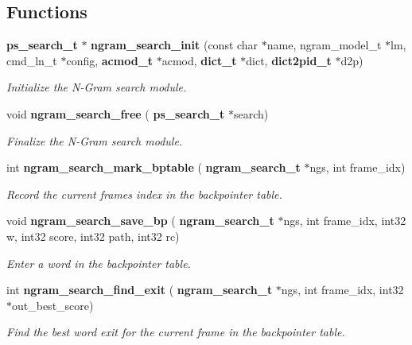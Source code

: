 \subsection*{Functions}
\begin{DoxyCompactItemize}
\item 
\mbox{\label{ngram__search_8c_a04f80b377c847026254fb85596e2f43c}} 
\textbf{ ps\+\_\+search\+\_\+t} $\ast$ \textbf{ ngram\+\_\+search\+\_\+init} (const char $\ast$name, ngram\+\_\+model\+\_\+t $\ast$lm, cmd\+\_\+ln\+\_\+t $\ast$config, \textbf{ acmod\+\_\+t} $\ast$acmod, \textbf{ dict\+\_\+t} $\ast$dict, \textbf{ dict2pid\+\_\+t} $\ast$d2p)
\begin{DoxyCompactList}\small\item\em Initialize the N-\/\+Gram search module. \end{DoxyCompactList}\item 
\mbox{\label{ngram__search_8c_aeaf140dc2bbeaa5c274f73480b5328f3}} 
void \textbf{ ngram\+\_\+search\+\_\+free} (\textbf{ ps\+\_\+search\+\_\+t} $\ast$search)
\begin{DoxyCompactList}\small\item\em Finalize the N-\/\+Gram search module. \end{DoxyCompactList}\item 
int \textbf{ ngram\+\_\+search\+\_\+mark\+\_\+bptable} (\textbf{ ngram\+\_\+search\+\_\+t} $\ast$ngs, int frame\+\_\+idx)
\begin{DoxyCompactList}\small\item\em Record the current frame\textquotesingle{}s index in the backpointer table. \end{DoxyCompactList}\item 
\mbox{\label{ngram__search_8c_ae36649be6f5a2190e759e7ed13bd7b6b}} 
void \textbf{ ngram\+\_\+search\+\_\+save\+\_\+bp} (\textbf{ ngram\+\_\+search\+\_\+t} $\ast$ngs, int frame\+\_\+idx, int32 w, int32 score, int32 path, int32 rc)
\begin{DoxyCompactList}\small\item\em Enter a word in the backpointer table. \end{DoxyCompactList}\item 
int \textbf{ ngram\+\_\+search\+\_\+find\+\_\+exit} (\textbf{ ngram\+\_\+search\+\_\+t} $\ast$ngs, int frame\+\_\+idx, int32 $\ast$out\+\_\+best\+\_\+score)
\begin{DoxyCompactList}\small\item\em Find the best word exit for the current frame in the backpointer table. \end{DoxyCompactList}\item 

\end{DoxyCompactItemize}

